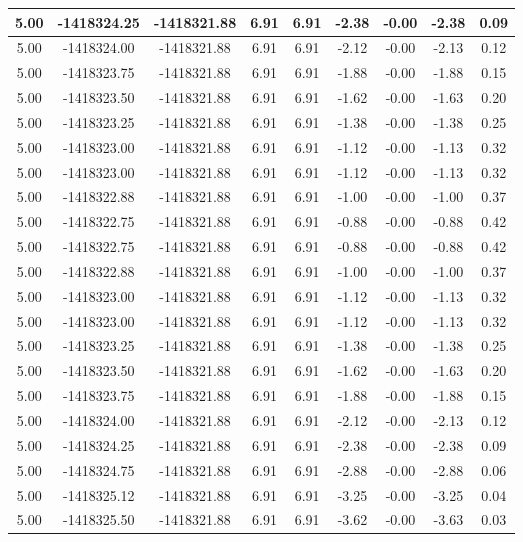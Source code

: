 \begin{table}[htbp]
\begin{adjustbox}{angle=90}
\begin{tabular}{|c|c|c|c|c|c|c|c|c|}
 5.00 & -1418324.25 & -1418321.88 & 6.91 & 6.91 & -2.38 & -0.00 & -2.38 & 0.09\\ \hline
 5.00 & -1418324.00 & -1418321.88 & 6.91 & 6.91 & -2.12 & -0.00 & -2.13 & 0.12\\ \hline
 5.00 & -1418323.75 & -1418321.88 & 6.91 & 6.91 & -1.88 & -0.00 & -1.88 & 0.15\\ \hline
 5.00 & -1418323.50 & -1418321.88 & 6.91 & 6.91 & -1.62 & -0.00 & -1.63 & 0.20\\ \hline
 5.00 & -1418323.25 & -1418321.88 & 6.91 & 6.91 & -1.38 & -0.00 & -1.38 & 0.25\\ \hline
 5.00 & -1418323.00 & -1418321.88 & 6.91 & 6.91 & -1.12 & -0.00 & -1.13 & 0.32\\ \hline
 5.00 & -1418323.00 & -1418321.88 & 6.91 & 6.91 & -1.12 & -0.00 & -1.13 & 0.32\\ \hline
 5.00 & -1418322.88 & -1418321.88 & 6.91 & 6.91 & -1.00 & -0.00 & -1.00 & 0.37\\ \hline
 5.00 & -1418322.75 & -1418321.88 & 6.91 & 6.91 & -0.88 & -0.00 & -0.88 & 0.42\\ \hline
 5.00 & -1418322.75 & -1418321.88 & 6.91 & 6.91 & -0.88 & -0.00 & -0.88 & 0.42\\ \hline
 5.00 & -1418322.88 & -1418321.88 & 6.91 & 6.91 & -1.00 & -0.00 & -1.00 & 0.37\\ \hline
 5.00 & -1418323.00 & -1418321.88 & 6.91 & 6.91 & -1.12 & -0.00 & -1.13 & 0.32\\ \hline
 5.00 & -1418323.00 & -1418321.88 & 6.91 & 6.91 & -1.12 & -0.00 & -1.13 & 0.32\\ \hline
 5.00 & -1418323.25 & -1418321.88 & 6.91 & 6.91 & -1.38 & -0.00 & -1.38 & 0.25\\ \hline
 5.00 & -1418323.50 & -1418321.88 & 6.91 & 6.91 & -1.62 & -0.00 & -1.63 & 0.20\\ \hline
 5.00 & -1418323.75 & -1418321.88 & 6.91 & 6.91 & -1.88 & -0.00 & -1.88 & 0.15\\ \hline
 5.00 & -1418324.00 & -1418321.88 & 6.91 & 6.91 & -2.12 & -0.00 & -2.13 & 0.12\\ \hline
 5.00 & -1418324.25 & -1418321.88 & 6.91 & 6.91 & -2.38 & -0.00 & -2.38 & 0.09\\ \hline
 5.00 & -1418324.75 & -1418321.88 & 6.91 & 6.91 & -2.88 & -0.00 & -2.88 & 0.06\\ \hline
 5.00 & -1418325.12 & -1418321.88 & 6.91 & 6.91 & -3.25 & -0.00 & -3.25 & 0.04\\ \hline
 5.00 & -1418325.50 & -1418321.88 & 6.91 & 6.91 & -3.62 & -0.00 & -3.63 & 0.03\\ \hline

\end{tabular}
\end{adjustbox}
\end{table}
